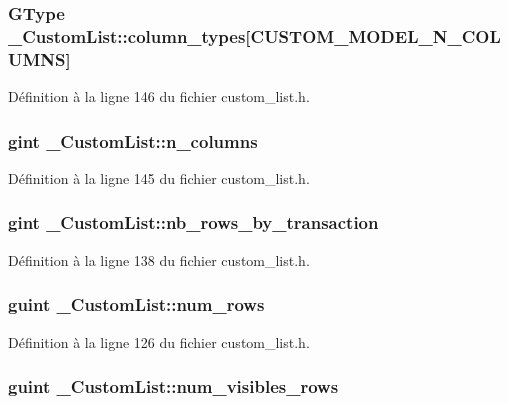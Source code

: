 \subsubsection[{column\_\-types}]{\setlength{\rightskip}{0pt plus 5cm}GType {\bf \_\-CustomList::column\_\-types}[CUSTOM\_\-MODEL\_\-N\_\-COLUMNS]}\label{struct__CustomList_a1310baccfe226bbb1c96ddeb0957aeef}


Définition à la ligne 146 du fichier custom\_\-list.h.

\subsubsection[{n\_\-columns}]{\setlength{\rightskip}{0pt plus 5cm}gint {\bf \_\-CustomList::n\_\-columns}}\label{struct__CustomList_a3af8fef589d45c0274032570bea7b26e}


Définition à la ligne 145 du fichier custom\_\-list.h.

\subsubsection[{nb\_\-rows\_\-by\_\-transaction}]{\setlength{\rightskip}{0pt plus 5cm}gint {\bf \_\-CustomList::nb\_\-rows\_\-by\_\-transaction}}\label{struct__CustomList_a4ff1c9958c853437c0340ab66e25f9cb}


Définition à la ligne 138 du fichier custom\_\-list.h.

\subsubsection[{num\_\-rows}]{\setlength{\rightskip}{0pt plus 5cm}guint {\bf \_\-CustomList::num\_\-rows}}\label{struct__CustomList_a767f2c2cec183c1d11dabb991c21382d}


Définition à la ligne 126 du fichier custom\_\-list.h.

\subsubsection[{num\_\-visibles\_\-rows}]{\setlength{\rightskip}{0pt plus 5cm}guint {\bf \_\-CustomList::num\_\-visibles\_\-rows}}\label{struct__CustomList_ab641f57c7760917443a80627b6e6b35f}


